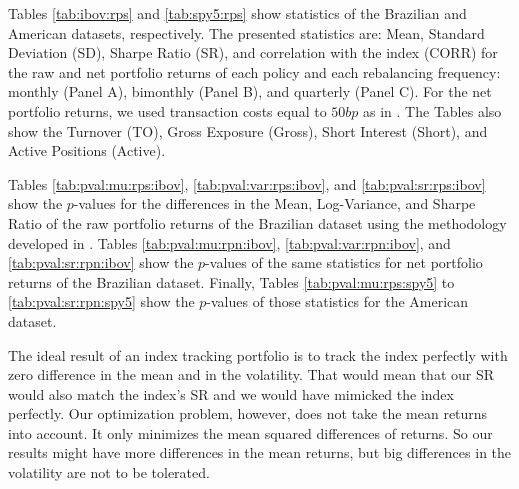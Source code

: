 \documentclass[12pt,oneside,a4paper]{memoir}
\begin{document}
Tables \ref{tab:ibov:rps} and \ref{tab:spy5:rps} show statistics of the Brazilian and American datasets, respectively.
The presented statistics are: Mean, Standard Deviation (SD), Sharpe Ratio (SR), and correlation with the index (CORR) for the raw and net portfolio returns of each policy and each rebalancing frequency: monthly (Panel A), bimonthly (Panel B), and quarterly (Panel C). 
For the net portfolio returns, we used transaction costs equal to $50bp$ as in .
The Tables also show the Turnover (TO), Gross Exposure (Gross), Short Interest (Short), and Active Positions (Active).



Tables 
\ref{tab:pval:mu:rps:ibov}, 
\ref{tab:pval:var:rps:ibov}, and 
\ref{tab:pval:sr:rps:ibov} 
show the $p$-values for the differences in the Mean, Log-Variance, and Sharpe Ratio of the raw portfolio returns of the Brazilian dataset using the methodology developed in .
Tables \ref{tab:pval:mu:rpn:ibov}, \ref{tab:pval:var:rpn:ibov}, and \ref{tab:pval:sr:rpn:ibov} show the $p$-values of the same statistics for net portfolio returns of the Brazilian dataset.
Finally, Tables \ref{tab:pval:mu:rps:spy5} to \ref{tab:pval:sr:rpn:spy5} 
show the $p$-values of those statistics for the American dataset.


The ideal result of an index tracking portfolio is to track the index perfectly with zero difference in the mean and in the volatility.
That would mean that our SR would also match the index's SR and we would have mimicked the index perfectly.
Our optimization problem, however, does not take the mean returns into account. 
It only minimizes the mean squared differences of returns.
So our results might have more differences in the mean returns, but big differences in the volatility are not to be tolerated.
\end{document}
